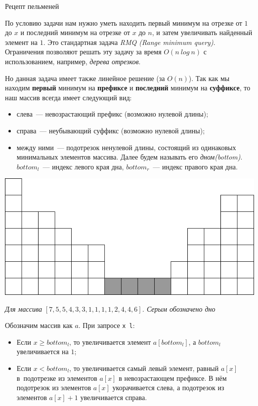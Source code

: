\begin{tutorial}{Рецепт пельменей}

По условию задачи нам нужно уметь находить первый минимум на отрезке от $1$ до $x$ и последний минимум на отрезке от $x$ до $n$, и затем увеличивать найденный элемент на $1$. Это стандартная задача \textit{RMQ (Range minimum query)}. Ограничения позволяют решать эту задачу за время $O(n~log~n)$ с использованием, например, \textit{дерева отрезков}.

Но данная задача имеет также линейное решение (за $O(n)$). Так как мы находим \textbf{первый} минимум на \textbf{префиксе} и \textbf{последний} минимум на \textbf{суффиксе}, то наш массив всегда имеет следующий вид:
\begin{itemize}
  \item слева~--- невозрастающий префикс (возможно нулевой длины);
  \item справа~--- неубывающий суффикс (возможно нулевой длины);
  \item между ними~--- подотрезок ненулевой длины, состоящий из одинаковых минимальных элементов массива. Далее будем называть его \textit{дном(bottom)}. $bottom_l$~--- индекс левого края дна, $bottom_r$~--- индекс правого края дна.
\end{itemize}

\begin{center}
  \includegraphics [width=.95\textwidth] {1.png}

  \textit{Для массива $[7, 5, 5, 4, 3, 3, 1, 1, 1, 1, 2, 4, 4, 6]$. Серым обозначено дно}
\end{center}

Обозначим массив как $a$. При запросе \texttt{x l}:
\begin{itemize}
  \item Если $x \ge bottom_l$, то увеличивается элемент $a[bottom_l]$, а $bottom_l$ увеличивается на $1$;
  \item Если $x < bottom_l$, то увеличивается самый левый элемент, равный $a[x]$ в~подотрезке из элементов $a[x]$ в невозрастающем префиксе. В нём подотрезок из элементов $a[x]$ укорачивается слева, а подотрезок из элементов $a[x] + 1$ увеличивается справа.
\end{itemize}


\end{tutorial}
